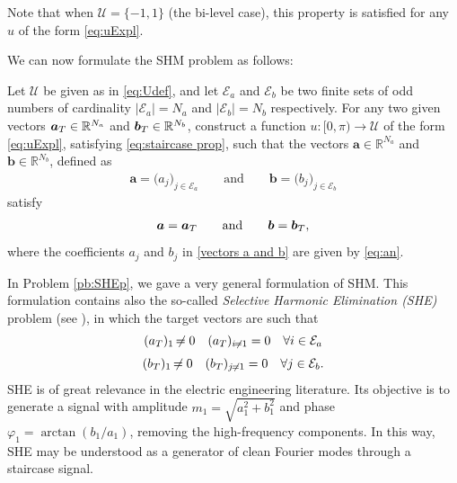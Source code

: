 \documentclass[twocolumn]{autart}    %
\begin{document}
Note that when $\mathcal{U} = \{-1,1\}$ (the bi-level case), this property is satisfied for any $u$ of the form \eqref{eq:uExpl}.

We can now formulate the SHM problem as follows:

\bigskip

\begin{problem}[SHM]\label{pb:SHEp}
Let $\mathcal{U}$ be given as in \eqref{eq:Udef}, and let $\mathcal{E} _a $ and $\mathcal{E} _b $ be two finite sets of odd numbers of cardinality $|\mathcal{E}_a| = N_a $ and $ |\mathcal{E} _b| = N_b$ respectively. For any two given vectors $\aT \in \mathbb{R}^{N_a}$ and $\bT \in \mathbb{R}^{N_b} $, construct a function $u: [0,\pi)\to\mathcal{U}$ of the form \eqref{eq:uExpl}, satisfying \eqref{eq:staircase prop}, such that the vectors $\bm{a} \in \mathbb{R}^{N_a}$ and $\bm{b} \in \mathbb{R}^{N_b}$, defined as
\begin{align}\label{vectors a and b}
	\bm{a} = \big( a_j \big)_{j\in \mathcal{E}_a} \qquad \text{and} \qquad
	\bm{b} = \big( b_j \big)_{j\in \mathcal{E}_b}
\end{align}
satisfy
\begin{align*} 
	\bm{a} = \aT \qquad \text{and} \qquad \bm{b} = \bT,
\end{align*}
where the coefficients $a_j$ and $b_j$ in \eqref{vectors a and b} are given by \eqref{eq:an}.
\end{problem}  
\vspace{1em}

\begin{remark}[SHE]\label{remark:SHE}
In Problem \ref{pb:SHEp}, we gave a very general formulation of SHM. This formulation contains also the so-called \emph{Selective Harmonic Elimination (SHE)} problem (see \cite{Sun1996}), in which the target vectors are such that 
\begin{gather}
	\notag (a_T)_1 \neq 0  \hspace{1em} (a_T)_{i\neq1} = 0 \hspace{1em} \forall i \in \mathcal{E}_a 
	\\[3pt]
	\notag (b_T)_1 \neq 0  \hspace{1em} (b_T)_{j\neq1} = 0 \hspace{1em} \forall j \in \mathcal{E}_b. 
\end{gather}
SHE is of great relevance in the electric engineering literature. Its objective is to generate a signal with amplitude $m_1 = \sqrt{a_1^2+b_1^2}$ and phase $\varphi_1=\arctan(b_1/a_1)$, removing the high-frequency components. In this way, SHE may be understood as a generator of clean Fourier modes through a staircase signal.
\end{remark}
\end{document}
